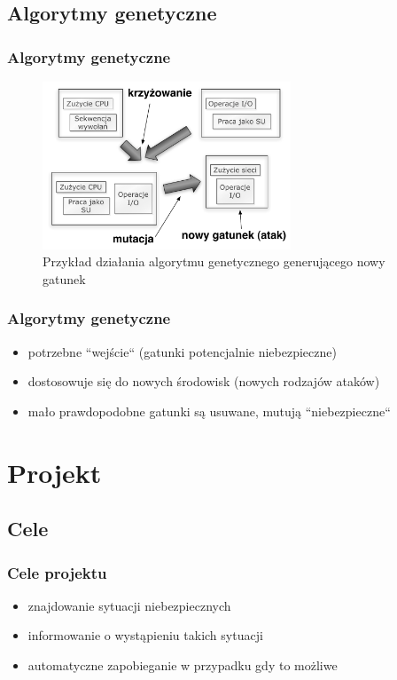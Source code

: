 \documentclass{beamer}
\begin{document}
\subsection{Algorytmy genetyczne}
\begin{frame}
  \frametitle{Algorytmy genetyczne}
    \begin{figure}
      \includegraphics[width=20em]{genetic_algorithm.pdf}
      \caption{Przykład działania algorytmu genetycznego generującego nowy gatunek}
    \end{figure}
\end{frame}
\begin{frame}
  \frametitle{Algorytmy genetyczne}
  \begin{itemize}
    \item potrzebne ``wejście`` (gatunki potencjalnie niebezpieczne)
    \item dostosowuje się do nowych środowisk (nowych rodzajów ataków)
    \item mało prawdopodobne gatunki są usuwane, mutują ``niebezpieczne``
  \end{itemize}
\end{frame}

\section{Projekt}
\subsection{Cele}
\begin{frame}
  \frametitle{Cele projektu}
  \begin{itemize}
    \item znajdowanie sytuacji niebezpiecznych
    \item informowanie o wystąpieniu takich sytuacji
    \item automatyczne zapobieganie w przypadku gdy to możliwe
  \end{itemize}
\end{frame}
\end{document}
